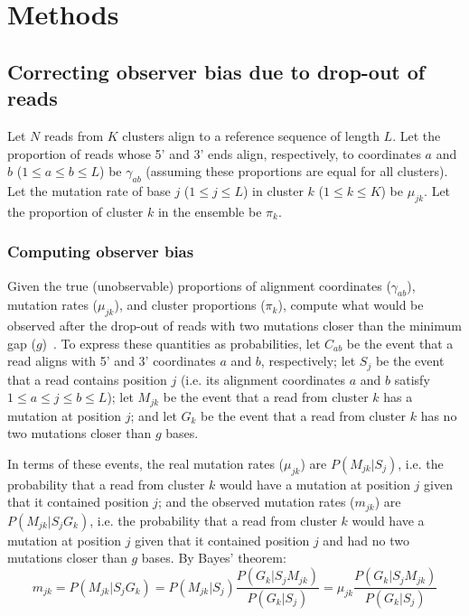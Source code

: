 \documentclass[main.tex]{subfiles}
\begin{document}
\section{Methods}
\label{methods}


\subsection{Correcting observer bias due to drop-out of reads}

Let $N$ reads from $K$ clusters align to a reference sequence of length $L$. Let the proportion of reads whose 5' and 3' ends align, respectively, to coordinates $a$ and $b$ ($1 \le a \le b \le L$) be $\gamma_{ab}$ (assuming these proportions are equal for all clusters). Let the mutation rate of base $j$ ($1 \le j \le L$) in cluster $k$ ($1 \le k \le K$) be $\mu_{jk}$. Let the proportion of cluster $k$ in the ensemble be $\pi_k$.

\subsubsection{Computing observer bias}

Given the true (unobservable) proportions of alignment coordinates ($\gamma_{ab}$), mutation rates ($\mu_{jk}$), and cluster proportions ($\pi_k$), compute what would be observed after the drop-out of reads with two mutations closer than the minimum gap ($g$)~\cite{Tomezsko2020}.
To express these quantities as probabilities, let $C_{ab}$ be the event that a read aligns with 5' and 3' coordinates $a$ and $b$, respectively; let $S_j$ be the event that a read contains position $j$ (i.e. its alignment coordinates $a$ and $b$ satisfy $1 \le a \le j \le b \le L$); let $M_{jk}$ be the event that a read from cluster $k$ has a mutation at position $j$; and let $G_k$ be the event that a read from cluster $k$ has no two mutations closer than $g$ bases.

In terms of these events, the real mutation rates ($\mu_{jk}$) are $P(M_{jk} | S_j)$, i.e. the probability that a read from cluster $k$ would have a mutation at position $j$ given that it contained position $j$; and the observed mutation rates ($m_{jk}$) are $P(M_{jk} | S_j G_k)$, i.e. the probability that a read from cluster $k$ would have a mutation at position $j$ given that it contained position $j$ and had no two mutations closer than $g$ bases.
By Bayes' theorem:
$$m_{jk} = P(M_{jk} | S_j G_k) = P(M_{jk} | S_j) \frac{P(G_k | S_j M_{jk})}{P(G_k | S_j)} = \mu_{jk} \frac{P(G_k | S_j M_{jk})}{P(G_k | S_j)}$$
\end{document}
